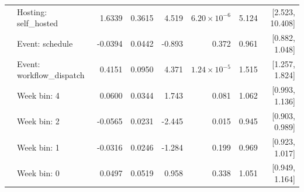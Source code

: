 \documentclass{article}
\begin{document}
\begin{longtable}{>{\raggedright\arraybackslash}p{2.4cm}>{\raggedright\arraybackslash}p{3.8cm}rrrrrr}
 & Hosting: self\_hosted & 1.6339 & 0.3615 & 4.519 & $6.20\times10^{-6}$ & 5.124 & [2.523, 10.408] \\
 & Event: schedule & -0.0394 & 0.0442 & -0.893 & 0.372 & 0.961 & [0.882, 1.048] \\
 & Event: workflow\_dispatch & 0.4151 & 0.0950 & 4.371 & $1.24\times10^{-5}$ & 1.515 & [1.257, 1.824] \\
 & Week bin: 4 & 0.0600 & 0.0344 & 1.743 & 0.081 & 1.062 & [0.993, 1.136] \\
 & Week bin: 2 & -0.0565 & 0.0231 & -2.445 & 0.015 & 0.945 & [0.903, 0.989] \\
 & Week bin: 1 & -0.0316 & 0.0246 & -1.284 & 0.199 & 0.969 & [0.923, 1.017] \\
 & Week bin: 0 & 0.0497 & 0.0519 & 0.958 & 0.338 & 1.051 & [0.949, 1.164] \\
\bottomrule\end{longtable}
\end{document}
